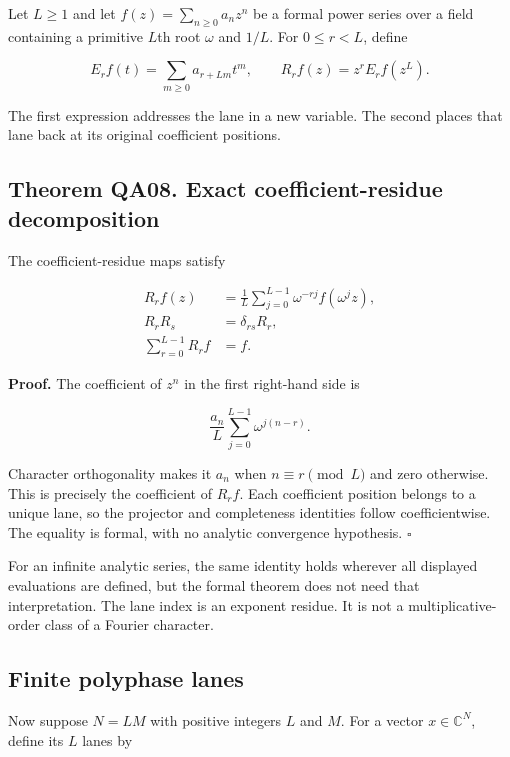 Let \(L\ge1\) and let \(f(z)=\sum_{n\ge0}a_nz^n\) be a formal power
series over a field containing a primitive \(L\)th root \(\omega\) and
\(1/L\). For \(0\le r<L\), define

\[
E_rf(t)=\sum_{m\ge0}a_{r+Lm}t^m,
\qquad
R_rf(z)=z^rE_rf(z^L).
\]

The first expression addresses the lane in a new variable. The second
places that lane back at its original coefficient positions.

\hypertarget{q:theorem-qa08.-exact-coefficient-residue-decomposition}{%
\subsection*{Theorem QA08. Exact coefficient-residue
decomposition}\label{q:theorem-qa08.-exact-coefficient-residue-decomposition}}

The coefficient-residue maps satisfy

\[
\begin{aligned}
R_rf(z)&=\frac1L\sum_{j=0}^{L-1}\omega^{-rj}f(\omega^jz),\\
R_rR_s&=\delta_{rs}R_r,\\
\sum_{r=0}^{L-1}R_rf&=f.
\end{aligned}
\]

\textbf{Proof.} The coefficient of \(z^n\) in the first right-hand side
is

\[
\frac{a_n}{L}\sum_{j=0}^{L-1}\omega^{j(n-r)}.
\]

Character orthogonality makes it \(a_n\) when \(n\equiv r\pmod L\) and
zero otherwise. This is precisely the coefficient of \(R_rf\). Each
coefficient position belongs to a unique lane, so the projector and
completeness identities follow coefficientwise. The equality is formal,
with no analytic convergence hypothesis. \(\square\)

For an infinite analytic series, the same identity holds wherever all
displayed evaluations are defined, but the formal theorem does not need
that interpretation. The lane index is an exponent residue. It is not a
multiplicative-order class of a Fourier character.

\hypertarget{q:finite-polyphase-lanes}{%
\subsection{Finite polyphase lanes}\label{q:finite-polyphase-lanes}}

Now suppose \(N=LM\) with positive integers \(L\) and \(M\). For a
vector \(x\in\mathbb C^N\), define its \(L\) lanes by

